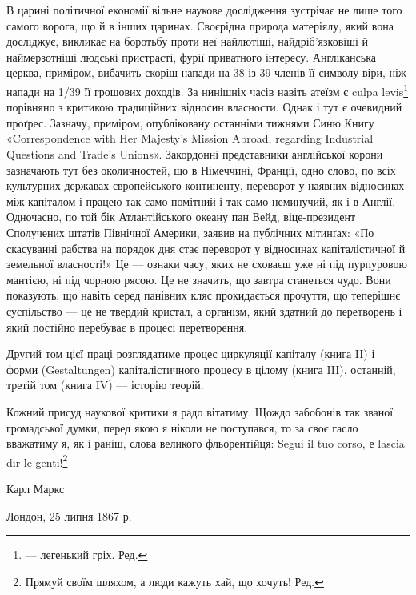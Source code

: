 В царині політичної економії вільне наукове дослідження
зустрічає не лише того самого ворога, що й в інших царинах.
Своєрідна природа матеріялу, який вона досліджує, викликає на
боротьбу проти неї найлютіші, найдріб’язковіші й наймерзотніші
людські пристрасті, фурії приватного інтересу. Англіканська
церква, приміром, вибачить скоріш напади на 38 із 39 членів
її символу віри, ніж напади на 1/39 її грошових доходів. За нинішніх
часів навіть атеїзм є culpa levis\footnote*{
— легенький гріх. Ред.
} порівняно з критикою
традиційних відносин власности. Однак і тут є очевидний проґрес.
Зазначу, приміром, опубліковану останніми тижнями Синю
Книгу «Correspondence with Her Majesty’s Mission Abroad, regarding
Industrial Questions and Trade’s Unions». Закордонні
представники англійської корони зазначають тут без околичностей,
що в Німеччині, Франції, одно слово, по всіх культурних
державах європейського континенту, переворот у наявних відносинах
між капіталом і працею так само помітний і так само неминучий,
як і в Англії. Одночасно, по той бік Атлантійського океану
пан Вейд, віце-президент Сполучених штатів Північної Америки,
заявив на публічних мітинґах: «По скасуванні рабства
на порядок дня стає переворот у відносинах капіталістичної й
земельної власності!» Це — ознаки часу, яких не сховаєш уже
ні під пурпуровою мантією, ні під чорною рясою. Це не значить,
що завтра станеться чудо. Вони показують, що навіть серед панівних
кляс прокидається прочуття, що теперішнє суспільство —
це не твердий кристал, а організм, який здатний до перетворень
і який постійно перебуває в процесі перетворення.

Другий том цієї праці розглядатиме процес циркуляції капіталу
(книга II) і форми (Gestaltungen) капіталістичного процесу
в цілому (книга III), останній, третій том (книга IV) — історію
теорій.

Кожний присуд наукової критики я радо вітатиму. Щождо
забобонів так званої громадської думки, перед якою я ніколи не
поступався, то за своє гасло вважатиму я, як і раніш, слова великого
фльорентійця: Segui il tuo corso, е lascia dir le genti!\footnote*{
Прямуй своїм шляхом, а люди кажуть хай, що хочуть! Ред.
}

Карл Маркс

Лондон, 25 липня 1867 р.
